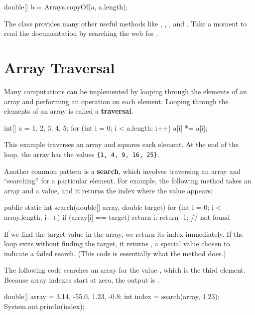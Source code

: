 \begin{code}
double[] b = Arrays.copyOf(a, a.length);
\end{code}

The  class provides many other useful methods like , , , and .
Take a moment to read the documentation by searching the web for .


\section{Array Traversal}
\label{traversal}


Many computations can be implemented by looping through the elements of an array and performing an operation on each element.
Looping through the elements of an array is called a {\bf traversal}.

\begin{code}
int[] a = {1, 2, 3, 4, 5};
for (int i = 0; i < a.length; i++) {
    a[i] *= a[i];
}
\end{code}

This example traverses an array and squares each element.
At the end of the loop, the array has the values 
\verb"{1, 4, 9, 16, 25}".


Another common pattern is a {\bf search}, which involves traversing an array and ``searching'' for a particular element.
For example, the following method takes an array and a value, and it returns the index where the value appears:

\begin{code}
public static int search(double[] array, double target) {
    for (int i = 0; i < array.length; i++) {
        if (array[i] == target) {
            return i;
        }
    }
    return -1;  // not found
}
\end{code}

If we find the target value in the array, we return its index immediately.
If the loop exits without finding the target, it returns , a special value chosen to indicate a failed search.
(This code is essentially what the  method does.)

The following code searches an array for the value , which is the third element.
Because array indexes start at zero, the output is .

\begin{code}
double[] array = {3.14, -55.0, 1.23, -0.8};
int index = search(array, 1.23);
System.out.println(index);
\end{code}


